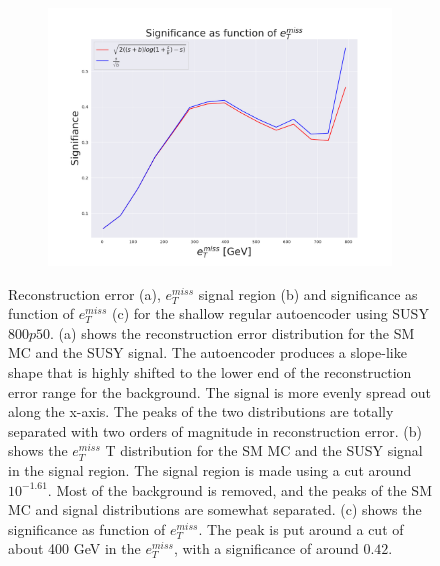 \begin{figure}[!htb]
    \hfill  
    \begin{subfigure}{.49\textwidth}
        \includegraphics[width=\textwidth]{Figures/AE_testing/small/2lep/significance_etmiss_800p0p050_-1.6117055611472277.pdf}
        \caption{}
        \label{fig:AE_2lep_small_signi_800}
    \end{subfigure}
    \hfill      
    \caption[2lep shallow network | $800p50$ | AE]{Reconstruction error (a), $e_T^{miss}$ signal region (b) and significance as function of 
    $e_T^{miss}$ (c) for the shallow regular autoencoder using SUSY $800p50$. 
    (a) shows the reconstruction error distribution for the SM MC and the SUSY signal. 
    The autoencoder produces a slope-like shape that is highly shifted to the lower end of the reconstruction error range
for the background. The signal is more evenly spread out along the x-axis. The peaks of the two distributions are totally separated
with two orders of magnitude in reconstruction error. (b) shows the $e_T^{miss}$
T distribution for the SM MC and the SUSY signal in the signal region. The signal region is made using a cut around
$10^{-1.61}$. Most of the background is removed, and the peaks of the SM MC and signal distributions are
somewhat separated. (c) shows the significance as function of $e_T^{miss}$. The peak is put 
around a cut of about 400 GeV in the $e_T^{miss}$, with a significance of around $0.42$.}
    \label{fig:AE_2lep_small_rec_sig_signi_800}
\end{figure}


